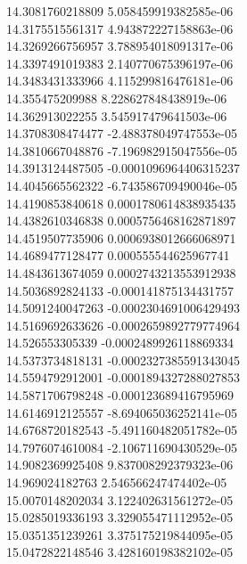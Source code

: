 {14.3081760218809 5.058459919382585e-06 \\
14.3175515561317 4.943872227158863e-06 \\
14.3269266756957 3.788954018091317e-06 \\
14.3397491019383 2.140770675396197e-06 \\
14.3483431333966 4.115299816476181e-06 \\
14.355475209988 8.228627848438919e-06 \\
14.362913022255 3.545917479641503e-06 \\
14.3708308474477 -2.488378049747553e-05 \\
14.3810667048876 -7.196982915047556e-05 \\
14.3913124487505 -0.0001096964406315237 \\
14.4045665562322 -6.743586709490046e-05 \\
14.4190853840618 0.0001780614838935435 \\
14.4382610346838 0.0005756468162871897 \\
14.4519507735906 0.0006938012666068971 \\
14.4689477128477 0.000555544625967741 \\
14.4843613674059 0.0002743213553912938 \\
14.5036892824133 -0.000141875134431757 \\
14.5091240047263 -0.0002304691006429493 \\
14.5169692633626 -0.0002659892779774964 \\
14.526553305339 -0.0002489926118869334 \\
14.5373734818131 -0.0002327385591343045 \\
14.5594792912001 -0.0001894327288027853 \\
14.5871706798248 -0.000123689416795969 \\
14.6146912125557 -8.694065036252141e-05 \\
14.6768720182543 -5.491160482051782e-05 \\
14.7976074610084 -2.106711690430529e-05 \\
14.9082369925408 9.837008292379323e-06 \\
14.969024182763 2.546566247474402e-05 \\
15.0070148202034 3.122402631561272e-05 \\
15.0285019336193 3.329055471112952e-05 \\
15.0351351239261 3.375175219844095e-05 \\
15.0472822148546 3.428160198382102e-05 \\
}
